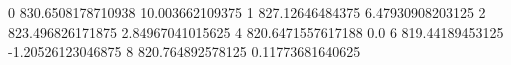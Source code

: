 0 830.6508178710938 10.003662109375
1 827.12646484375 6.47930908203125
2 823.496826171875 2.84967041015625
4 820.6471557617188 0.0
6 819.44189453125 -1.20526123046875
8 820.764892578125 0.11773681640625

